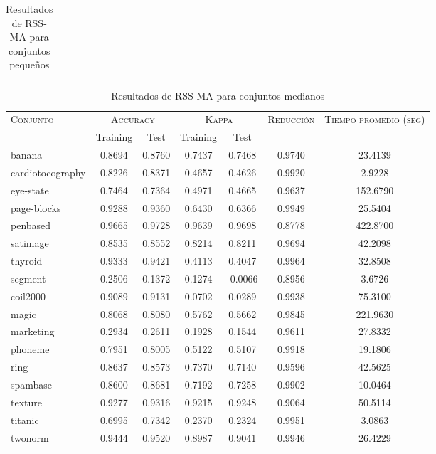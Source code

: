 \begin{table}[]
\begin{tabular}{l c c c c c c}
\hline
\end{tabular}
\caption{Resultados de RSS-MA para conjuntos pequeños }
\label{res-peq-RSS-MA}
\end{table}

\begin{table}[]
\centering
\begin{tabular}{l c c c c c c}
\hline
\multirow{2}{*}{\textsc{Conjunto}}
	& \multicolumn{2}{c}{\textsc{Accuracy}}
	& \multicolumn{2}{c}{\textsc{Kappa}}
	& \textsc{Reducción}
	& \textsc{Tiempo promedio (seg)} \\
	& Training & Test
	& Training & Test \\ 
\hline
\hline

banana & 0.8694 & 0.8760 & 0.7437 & 0.7468 & 0.9740 & 23.4139 \\
cardiotocography & 0.8226 & 0.8371 & 0.4657 & 0.4626 & 0.9920 & 2.9228 \\
eye-state & 0.7464 & 0.7364 & 0.4971 & 0.4665 & 0.9637 & 152.6790 \\
page-blocks & 0.9288 & 0.9360 & 0.6430 & 0.6366 & 0.9949 & 25.5404 \\
penbased & 0.9665 & 0.9728 & 0.9639 & 0.9698 & 0.8778 & 422.8700 \\
satimage & 0.8535 & 0.8552 & 0.8214 & 0.8211 & 0.9694 & 42.2098 \\
thyroid & 0.9333 & 0.9421 & 0.4113 & 0.4047 & 0.9964 & 32.8508 \\
segment & 0.2506 & 0.1372 & 0.1274 & -0.0066 & 0.8956 & 3.6726 \\
coil2000 & 0.9089 & 0.9131 & 0.0702 & 0.0289 & 0.9938 & 75.3100 \\
magic & 0.8068 & 0.8080 & 0.5762 & 0.5662 & 0.9845 & 221.9630 \\
marketing & 0.2934 & 0.2611 & 0.1928 & 0.1544 & 0.9611 & 27.8332 \\
phoneme & 0.7951 & 0.8005 & 0.5122 & 0.5107 & 0.9918 & 19.1806 \\
ring & 0.8637 & 0.8573 & 0.7370 & 0.7140 & 0.9596 & 42.5625 \\
spambase & 0.8600 & 0.8681 & 0.7192 & 0.7258 & 0.9902 & 10.0464 \\
texture & 0.9277 & 0.9316 & 0.9215 & 0.9248 & 0.9064 & 50.5114 \\
titanic & 0.6995 & 0.7342 & 0.2370 & 0.2324 & 0.9951 & 3.0863 \\
twonorm & 0.9444 & 0.9520 & 0.8987 & 0.9041 & 0.9946 & 26.4229 \\

\hline
\end{tabular}
\caption{Resultados de RSS-MA para conjuntos medianos }
\label{res-med-RSS-MA}
\end{table}




